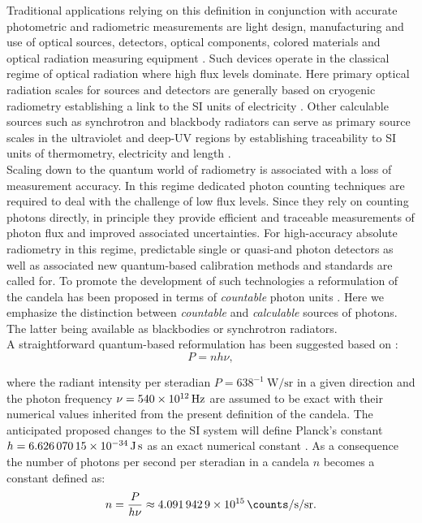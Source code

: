		Traditional applications relying on this definition in conjunction with accurate photometric and radiometric measurements are light design, manufacturing and use of optical sources, detectors, optical components, colored materials and optical radiation measuring equipment \cite{zwinkels2010photometry}.
		Such devices operate in the classical regime of optical radiation where high flux levels dominate. Here primary optical radiation scales for sources and detectors are generally based on cryogenic radiometry establishing a link to the SI units of electricity \cite{fox20052}. Other calculable sources such as synchrotron and blackbody radiators can serve as primary source scales in the ultraviolet and deep-UV regions by establishing traceability to SI units of thermometry, electricity and length \cite{zwinkels2010photometry, Cheung2007}.
		\\
		Scaling down to the quantum world of radiometry is associated with a loss of measurement accuracy. In this regime dedicated photon counting techniques are required to deal with the challenge of low flux levels. Since they rely on counting photons directly, in principle they provide efficient and traceable measurements of photon flux and improved associated uncertainties. For high-accuracy absolute radiometry in this regime, predictable single or quasi-\spss and photon detectors as well as associated new quantum-based calibration methods and standards are called for. To promote the development of such technologies a reformulation of the candela has been proposed in terms of \emph{countable} photon units \cite{zwinkels2010photometry, Cheung2007, SIHighlights2017, QuCandelaProject}. Here we emphasize the distinction between \emph{countable} and \emph{calculable} sources of photons. The latter being available as blackbodies or synchrotron radiators.
		\\
		A straightforward quantum-based reformulation has been suggested based on \cite{Cheung2007, zwinkels2010photometry}:
% 
		\begin{equation}
			P = n h \nu,
		\end{equation}

		where the radiant intensity per steradian $P = 638^{-1} \SI{}{\watt\per\steradian}$ in a given direction and the photon frequency $\nu = \SI{540d12}{\hertz}$ are assumed to be exact with their numerical values inherited from the present definition of the candela. The anticipated proposed changes to the SI system will define Planck's constant $h = \SI{6.62607015d-34}{\joule\second}$ as an exact numerical constant \cite{SIproposal}. As a consequence the number of photons per second per steradian in a candela $n$ becomes a constant defined as:
% 
		\begin{equation}
			n = \frac{P}{h \nu} \approx \SI{4.0919429d15}{\counts\per\second\per\steradian}.
		\end{equation}

